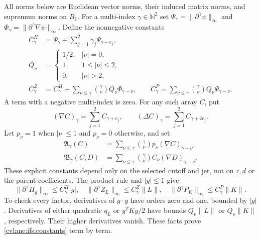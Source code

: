 All norms below are Euclidean vector norms, their induced matrix
norms, and supremum norms on $B_1$.
For a multi-index $\gamma\in\mathbb N^2$ set
$\Psi_\gamma=\|\partial^\gamma\psi\|_\infty$ and
$\Phi_\gamma=\|\partial^\gamma\nabla\psi\|_\infty$.
Define the nonnegative constants
\begin{align}
 C^H_\gamma&=\Psi_\gamma+\sum_{j=1}^2
                        \gamma_j\Psi_{\gamma-e_j},\nonumber\\
 Q_\nu&=
 \begin{cases}
 1/2,&|\nu|=0,\\
 1,&1\leq|\nu|\leq2,\\
 0,&|\nu|>2,
 \end{cases}\nonumber\\
 C^Z_\gamma&=C^H_\gamma+
       \sum_{\nu\leq\gamma}\binom\gamma\nu Q_\nu\Phi_{\gamma-\nu},
 \qquad
 C^P_\gamma=\sum_{\nu\leq\gamma}
                   \binom\gamma\nu Q_\nu\Psi_{\gamma-\nu}.
 \label{cvlane:ifs:constants}
\end{align}
A term with a negative multi-index is zero.
For any such array $C$, put
\[
 (\nabla C)_\gamma=\sum_{j=1}^2 C_{\gamma+e_j},\qquad
 (\Delta C)_\gamma=\sum_{j=1}^2 C_{\gamma+2e_j}.
\]
Let $p_\nu=1$ when $|\nu|\leq1$ and $p_\nu=0$ otherwise, and set
\begin{align}
 \mathfrak A_\gamma(C)
 &=\sum_{\nu\leq\gamma}\binom\gamma\nu
                         p_\nu(\nabla C)_{\gamma-\nu},\nonumber\\
 \mathfrak B_\gamma(C,D)
 &=\sum_{\nu\leq\gamma}\binom\gamma\nu
                         C_\nu(\nabla D)_{\gamma-\nu}.
 \label{cvlane:ifs:product-constants}
\end{align}
These explicit constants depend only on the selected cutoff and jet,
not on $r,d$ or the parent coefficients.
The product rule and $|y|\leq1$ give
\begin{equation}\label{cvlane:ifs:linear-map-bounds}
 \|\partial^\gamma H_g\|_\infty\leq C^H_\gamma|g|,
 \quad
 \|\partial^\gamma Z_L\|_\infty\leq C^Z_\gamma\|L\|,
 \quad
 \|\partial^\gamma P_K\|_\infty\leq C^P_\gamma\|K\|.
\end{equation}
To check every factor, derivatives of $g\cdot y$ have orders zero
and one, bounded by $|g|$.  Derivatives of either quadratic
$q_L$ or $y^TKy/2$ have bounds $Q_\nu\|L\|$ or
$Q_\nu\|K\|$, respectively.  Their higher derivatives vanish.
These facts prove \eqref{cvlane:ifs:constants} term by term.

